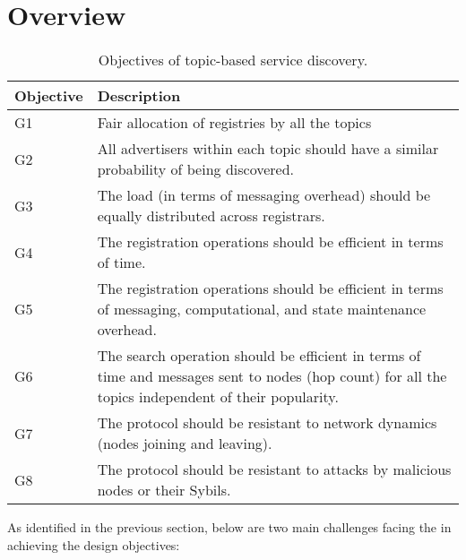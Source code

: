 \section{Overview}
\label{sec:overview}

\begin{table} 
\caption{Objectives of topic-based service discovery.}
\label{tab:objectives}
\renewcommand{\arraystretch}{1.5}
\renewcommand{\tabcolsep}{0.5em}
\centering
\scriptsize{
\begin{tabular} {p{1cm}p{5cm}}
\toprule
\textbf{Objective} & \textbf{Description} \\
\hline
G1 & Fair allocation of registries by all the topics \\
\hline
G2 & All advertisers within each topic should have a similar probability of being discovered. \\
\hline
G3 & The load (in terms of messaging overhead) should be equally distributed across registrars. \\
\hline
G4 & The registration operations should be efficient in terms of time. \\
\hline
G5 & The registration operations should be efficient in terms of messaging, computational, and state maintenance overhead. \\
\hline 
G6 & The search operation should be efficient in terms of time and messages sent to nodes (hop count) for all the topics independent of their popularity. \\
\hline
G7 & The protocol should be resistant to network dynamics (nodes joining and leaving). \\
\hline 
G8 & The protocol should be resistant to attacks by malicious nodes or their Sybils. \\
\hline
\end{tabular}
}
\vspace{-0.2in}
\end{table}


As identified in the previous section, below are two main challenges facing the \sysname in achieving the design objectives:

